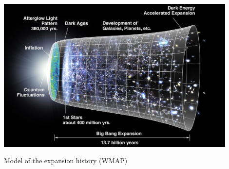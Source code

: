 \documentclass{beamer}
\begin{document}
\frame
{
    \begin{center}
        \includegraphics[width=0.9\textwidth]{CMB_Timeline300_no_WMAP.jpg}
    \end{center}
    {\normalsize Model of the expansion history (WMAP)}
}
\end{document}
